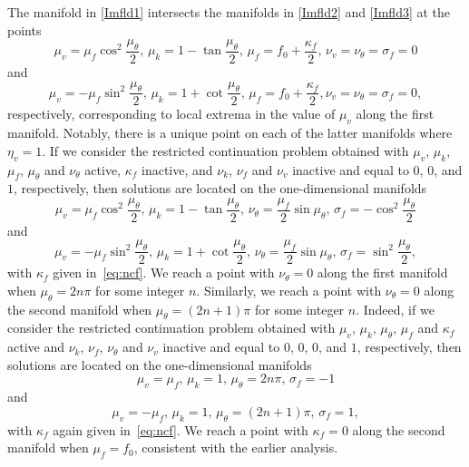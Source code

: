 The manifold in \eqref{Imfld1} intersects the manifolds in \eqref{Imfld2} and \eqref{Imfld3} at the points
\begin{equation}
\mu_v=\mu_f\cos^2\frac{\mu_\theta}{2},\,\mu_k=1-\tan\frac{\mu_\theta}{2},\,\mu_f=f_0+\frac{\kappa_f}{2},\,\nu_v=\nu_\theta=\sigma_f=0
\end{equation}
and
\begin{equation}
\mu_v=-\mu_f\sin^2\frac{\mu_\theta}{2},\,\mu_k=1+\cot\frac{\mu_\theta}{2},\,\mu_f=f_0+\frac{\kappa_f}{2},\nu_v=\nu_\theta=\sigma_f=0,
\end{equation}
respectively, corresponding to local extrema in the value of $\mu_v$ along the first manifold. Notably, there is a unique point on each of the latter manifolds where $\eta_v=1$. If we consider the restricted continuation problem obtained with $\mu_v$, $\mu_k$, $\mu_f$, $\mu_\theta$ and $\nu_\theta$ active, $\kappa_f$ inactive, and $\nu_k$, $\nu_f$ and $\nu_v$ inactive and equal to $0$, $0$, and $1$, respectively, then solutions are located on the one-dimensional manifolds
\begin{equation}
\mu_v=\mu_f\cos^2\frac{\mu_\theta}{2},\,\mu_k=1-\tan\frac{\mu_\theta}{2},\,\nu_\theta=\frac{\mu_f}{2}\sin\mu_\theta,\,\sigma_f=-\cos^2\frac{\mu_\theta}{2}
\end{equation}
and
\begin{equation}
\mu_v=-\mu_f\sin^2\frac{\mu_\theta}{2},\,\mu_k=1+\cot\frac{\mu_\theta}{2},\,\nu_\theta=\frac{\mu_f}{2}\sin\mu_\theta,\,\sigma_f=\sin^2\frac{\mu_\theta}{2},
\end{equation}
with $\kappa_f$ given in~\eqref{eq:ncf}. We reach a point with $\nu_\theta=0$ along the first manifold when $\mu_\theta=2n\pi$ for some integer $n$. Similarly, we reach a point with $\nu_\theta=0$ along the second manifold when $\mu_\theta=(2n+1)\pi$ for some integer $n$. Indeed, if we consider the restricted continuation problem obtained with $\mu_v$, $\mu_k$, $\mu_\theta$, $\mu_f$ and $\kappa_f$ active and $\nu_k$, $\nu_f$, $\nu_\theta$ and $\nu_v$ inactive and equal to $0$, $0$, $0$, and $1$, respectively, then solutions are located on the one-dimensional manifolds
\begin{equation}
\mu_v=\mu_f,\,\mu_k=1,\,\mu_\theta=2n\pi,\,\sigma_f=-1
\end{equation}
and
\begin{equation}
\mu_v=-\mu_f,\,\mu_k=1,\,\mu_\theta=(2n+1)\pi,\,\sigma_f=1,
\end{equation}
with $\kappa_f$ again given in~\eqref{eq:ncf}. We reach a point with $\kappa_f=0$ along the second manifold when $\mu_f=f_0$, consistent with the earlier analysis.

